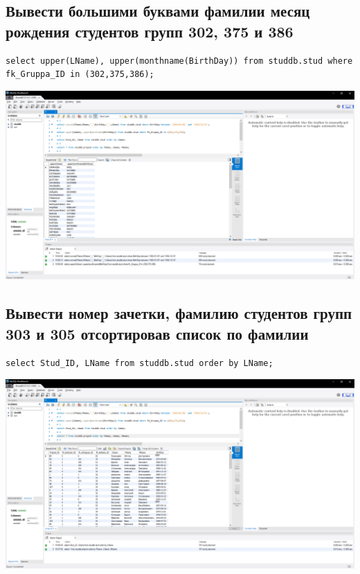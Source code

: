 \documentclass[a4paper, 12pt]{article}
\begin{document}
\subsection{Вывести большими буквами фамилии месяц рождения  студентов  групп 302, 375 и  386}
\begin{lstlisting}
select upper(LName), upper(monthname(BirthDay)) from studdb.stud where fk_Gruppa_ID in (302,375,386);
\end{lstlisting}
\includegraphics[width=\textwidth]{5-2.png}

\subsection{Вывести номер зачетки, фамилию студентов групп 303 и 305 отсортировав  список по фамилии}
\begin{lstlisting}
select Stud_ID, LName from studdb.stud order by LName; 
\end{lstlisting}
\includegraphics[width=\textwidth]{5-3.png}
\end{document}

